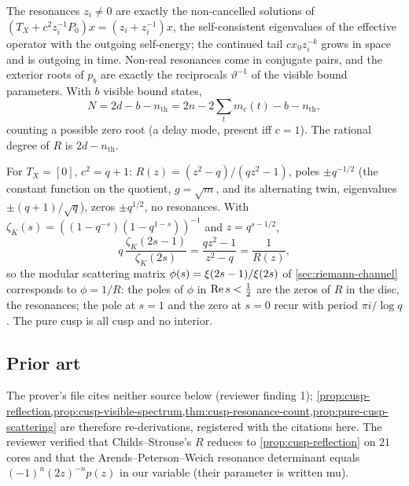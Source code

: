 \begin{theorem}
\label{thm:cusp-resonance-count}
The resonances $z_i\neq0$ are exactly the non-cancelled solutions of
$(T_X + c^2z_i^{-1}P_0)x = (z_i+z_i^{-1})x$, the self-consistent eigenvalues of the effective operator with
the outgoing self-energy; the continued tail $cx_0z_i^{-k}$ grows in space and is outgoing in time. Non-real
resonances come in conjugate pairs, and the exterior roots of $p_b$ are exactly the reciprocals $\vartheta^{-1}$
of the visible bound parameters. With $b$ visible bound states,
\[
N = 2d - b - n_{\mathrm{th}} = 2n - 2\textstyle\sum_t m_c(t) - b - n_{\mathrm{th}} ,
\]
counting a possible zero root (a delay mode, present iff $c = 1$). The rational degree of $R$ is $2d-n_{\mathrm{th}}$.
\end{theorem}

\begin{proposition}
\label{prop:pure-cusp-scattering}
For $T_X = [0]$, $c^2 = q+1$: $R(z) = (z^2-q)/(qz^2-1)$, poles $\pm q^{-1/2}$ (the constant function on the
quotient, $g = \sqrt m$, and its alternating twin, eigenvalues $\pm(q+1)/\sqrt q$), zeros $\pm q^{1/2}$,
no resonances. With $\zeta_K(s) = ((1-q^{-s})(1-q^{1-s}))^{-1}$ and $z = q^{s-1/2}$,
\[
q\,\frac{\zeta_K(2s-1)}{\zeta_K(2s)} = \frac{qz^2-1}{z^2-q} = \frac1{R(z)} ,
\]
so the modular scattering matrix $\phi(s) = \xi(2s-1)/\xi(2s)$ of \cref{sec:riemann-channel} corresponds to
$\phi = 1/R$: the poles of $\phi$ in $\operatorname{Re} s<\tfrac12$ are the zeros of $R$ in the disc, the resonances; the
pole at $s = 1$ and the zero at $s = 0$ recur with period $\pi i/\log q$. The pure cusp is all cusp and no
interior.
\end{proposition}

\subsection{Prior art}

The prover's file cites neither source below (reviewer finding 1); \cref{prop:cusp-reflection,prop:cusp-visible-spectrum,thm:cusp-resonance-count,prop:pure-cusp-scattering}
are therefore re-derivations, registered with the citations here. The reviewer verified that Childs--Strouse's
$R$ reduces to \cref{prop:cusp-reflection} on $21$ cores and that the Arends--Peterson--Weich resonance determinant equals $(-1)^n(2z)^{-n}p(z)$ in our
variable (their parameter is written mu).

